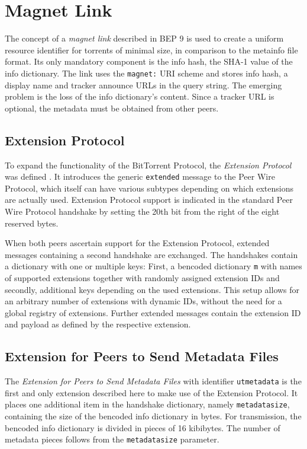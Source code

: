 \documentclass[10pt, a4paper, twoside, headsepline]{scrbook}
\renewcommand{\_}{\origunderscore\allowbreak}
\begin{document}
\section{Magnet Link}
The concept of a \emph{magnet link} described in BEP 9 \cite{bep9} is used to create a uniform resource identifier for torrents of minimal size, in comparison to the metainfo file format. Its only mandatory component is the info hash, the SHA-1 value of the info dictionary. The link uses the \texttt{magnet:} URI scheme and stores info hash, a display name and tracker announce URLs in the query string. The emerging problem is the loss of the info dictionary's content. Since a tracker URL is optional, the metadata must be obtained from other peers.

\subsection{Extension Protocol}
To expand the functionality of the BitTorrent Protocol, the \emph{Extension Protocol} was defined \cite{bep10}. It introduces the generic \texttt{extended} message to the Peer Wire Protocol, which itself can have various subtypes depending on which extensions are actually used. Extension Protocol support is indicated in the standard Peer Wire Protocol handshake by setting the 20th bit from the right of the eight reserved bytes.

When both peers ascertain support for the Extension Protocol, extended messages containing a second handshake are exchanged. The handshakes contain a dictionary with one or multiple keys: First, a bencoded dictionary \texttt{m} with names of supported extensions together with randomly assigned extension IDs and secondly, additional keys depending on the used extensions. This setup allows for an arbitrary number of extensions with dynamic IDs, without the need for a global registry of extensions. Further extended messages contain the extension ID and payload as defined by the respective extension.

\subsection{Extension for Peers to Send Metadata Files}
The \emph{Extension for Peers to Send Metadata Files} \cite{bep9} with identifier \texttt{ut\_metadata} is the first and only extension described here to make use of the Extension Protocol. It places one additional item in the handshake dictionary, namely \texttt{metadata\_size}, containing the size of the bencoded info dictionary in bytes. For transmission, the bencoded info dictionary is divided in pieces of 16 kibibytes. The number of metadata pieces follows from the \texttt{metadata\_size} parameter.
\end{document}
